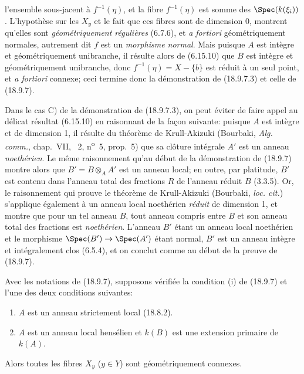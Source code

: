 
l'ensemble sous-jacent à $f^{-1}(\eta)$, et la fibre $f^{-1}(\eta)$ est somme des $\Spec(k(\xi_i))$. L'hypothèse sur les $X_y$ et le fait que ces fibres sont de dimension 0, montrent qu'elles sont \emph{géométriquement régulières} (6.7.6), et \emph{a fortiori} géométriquement normales, autrement dit $f$ est un \emph{morphisme normal}. Mais puisque $A$ est intègre et géométriquement unibranche, il résulte alors de (6.15.10) que $B$ est intègre et géométriquement unibranche, donc $f^{-1}(\eta)=X-\{b\}$ est réduit à un seul point, et \emph{a fortiori} connexe; ceci termine donc la démonstration de (18.9.7.3) et celle de (18.9.7).

\begin{remark}[18.9.7.8]
\label{IV.18.9.7.8}
Dans le cas C) de la démonstration de (18.9.7.3), on peut éviter de faire appel au délicat résultat (6.15.10) en raisonnant de la façon suivante: puisque $A$ est intègre et de dimension 1, il résulte du théorème de Krull-Akizuki (Bourbaki, \emph{Alg. comm.}, chap.~VII, \textsection~2, n\textsuperscript{o}~5, prop.~5) que sa clôture intégrale $A'$ est un anneau \emph{noethérien}. Le même raisonnement qu'au début de la démonstration de (18.9.7) montre alors que $B'=B\otimes_A A'$ est un anneau local; en outre, par platitude, $B'$ est contenu dans l'anneau total des fractions $R$ de l'anneau réduit $B$ (3.3.5). Or, le raisonnement qui prouve le théorème de Krull-Akizuki (Bourbaki, \emph{loc. cit.}) s'applique également à un anneau local noethérien \emph{réduit} de dimension 1, et montre que pour un tel anneau $B$, tout anneau compris entre $B$ et son anneau total des fractions est \emph{noethérien}. L'anneau $B'$ étant un anneau local noethérien et le morphisme $\Spec(B')\to\Spec(A')$ étant normal, $B'$ est un anneau intègre et intégralement clos (6.5.4), et on conclut comme au début de la preuve de (18.9.7).
\end{remark}

\begin{corollary}[18.9.8]
\label{IV.18.9.8}
Avec les notations de (18.9.7), supposons vérifiée la condition (i) de (18.9.7) et l'une des deux conditions suivantes:
\begin{enumerate}
  \item[(ii$'$)] $A$ est un anneau strictement local (18.8.2).
  \item[(ii$''$)] $A$ est un anneau local hensélien et $k(B)$ est une extension primaire de $k(A)$.
\end{enumerate}
Alors toutes les fibres $X_y$ ($y\in Y$) sont géométriquement connexes.
\end{corollary}


